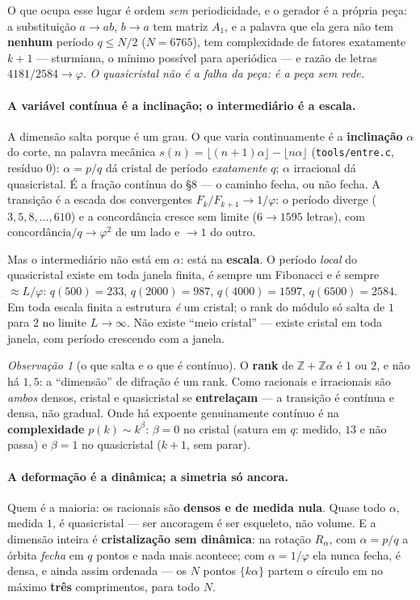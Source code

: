 \documentclass[11pt]{article}
\newcommand{\code}[1]{\texttt{\small #1}}
\newcommand{\Z}{\mathbb Z}
\theoremstyle{plain}
\theoremstyle{remark}
\newtheorem{obs}{Observação}
\begin{document}
O que ocupa esse lugar é ordem \emph{sem} periodicidade, e o gerador é a própria peça: a substituição
$a\to ab$, $b\to a$ tem matriz $A_1$, e a palavra que ela gera não tem \textbf{nenhum} período
$q\le N/2$ ($N=6765$), tem complexidade de fatores exatamente $k+1$ --- sturmiana, o mínimo possível
para aperiódica --- e razão de letras $4181/2584\to\varphi$. \emph{O quasicristal não é a falha da
peça: é a peça sem rede.}

\paragraph{A variável contínua é a inclinação; o intermediário é a escala.} A dimensão salta porque é
um grau. O que varia continuamente é a \textbf{inclinação} $\alpha$ do corte, na palavra mecânica
$s(n)=\lfloor(n{+}1)\alpha\rfloor-\lfloor n\alpha\rfloor$ (\code{tools/entre.c}, resíduo $0$):
$\alpha=p/q$ dá cristal de período \emph{exatamente} $q$; $\alpha$ irracional dá quasicristal. É a
fração contínua do §8 --- o caminho fecha, ou não fecha. A transição é a escada dos convergentes
$F_k/F_{k+1}\to1/\varphi$: o período diverge ($3,5,8,\dots,610$) e a concordância cresce sem limite
($6\to1595$ letras), com $\text{concordância}/q\to\varphi^2$ de um lado e $\to1$ do outro.

Mas o intermediário não está em $\alpha$: está na \textbf{escala}. O período \emph{local} do
quasicristal existe em toda janela finita, é sempre um Fibonacci e é sempre $\approx L/\varphi$:
$q(500)=233$, $q(2000)=987$, $q(4000)=1597$, $q(6500)=2584$. Em toda escala finita a estrutura
\emph{é} um cristal; o rank do módulo só salta de $1$ para $2$ no limite $L\to\infty$. Não existe
``meio cristal'' --- existe cristal em toda janela, com período crescendo com a janela.

\begin{obs}[o que salta e o que é contínuo]
O \textbf{rank} de $\Z+\Z\alpha$ é $1$ ou $2$, e não há $1{,}5$: a ``dimensão'' de difração é um rank.
Como racionais e irracionais são \emph{ambos} densos, cristal e quasicristal se \textbf{entrelaçam} ---
a transição é contínua e densa, não gradual. Onde há expoente genuinamente contínuo é na
\textbf{complexidade} $p(k)\sim k^\beta$: $\beta=0$ no cristal (satura em $q$: medido, $13$ e não
passa) e $\beta=1$ no quasicristal ($k+1$, sem parar).
\end{obs}

\paragraph{A deformação é a dinâmica; a simetria só ancora.} Quem é a maioria: os racionais são
\textbf{densos e de medida nula}. Quase todo $\alpha$, medida $1$, é quasicristal --- ser ancoragem é
ser esqueleto, não volume. E a dimensão inteira é \textbf{cristalização sem dinâmica}: na rotação
$R_\alpha$, com $\alpha=p/q$ a órbita \emph{fecha} em $q$ pontos e nada mais acontece; com
$\alpha=1/\varphi$ ela nunca fecha, é densa, e ainda assim ordenada --- os $N$ pontos $\{k\alpha\}$
partem o círculo em no máximo \textbf{três} comprimentos, para todo $N$.
\end{document}
